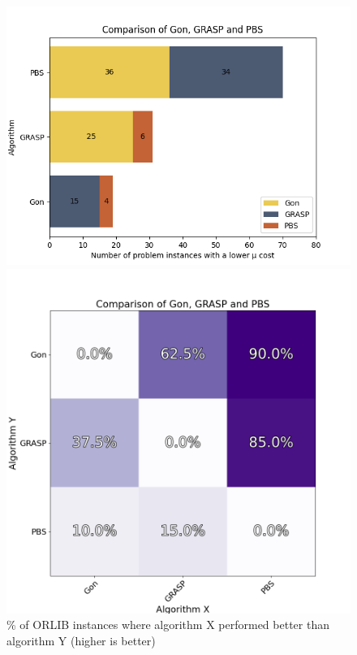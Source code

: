 \begin{figure}[H]
    \begin{minipage}{0.57\textwidth}
        \centering
        \includegraphics[width=\textwidth]{images/compare_three_alg.png}
        \caption{Number of problem instances where an\newline algorithm performed better than another (higher\newline is better)}
        \label{fig:compare_three_alg}
    \end{minipage}
    \begin{minipage}{0.43\textwidth}
        \centering
        \includegraphics[width=\textwidth]{images/k_center_conf_matrix.png}
        \caption{\% of ORLIB instances where algorithm X performed better than algorithm Y (higher is better)}
        \label{fig:compare_three_alg_conf_matrix}
    \end{minipage}
\end{figure}

